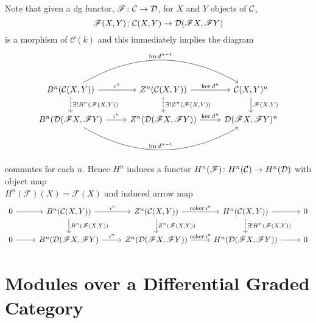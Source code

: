 \documentclass[dissertation.tex]{subfiles}
\begin{document}
\begin{rmk}\label{DGInducedHomology}
  Note that given a dg functor, $\mathscr{F} \colon \mathcal{C} \rightarrow \mathcal{D}$, for $X$ and $Y$ objects of $\mathcal{C}$, 
  $$\mathscr{F}(X,Y) \colon \mathcal{C}(X,Y) \rightarrow \mathcal{D}(\mathscr{F}X, \mathscr{F}Y)$$
  is a morphism of $\mathcal{C}(k)$ and this immediately implies the diagram
  $$\begin{tikzcd}
    B^n(\C(X,Y))\arrow{r}{\imath^n}\arrow[bend left]{rr}{\im d^{n-1}}\arrow[dashed]{d}{\exists !B^n(\F(X,Y))} & Z^n(\C(X,Y)) \arrow{r}{\ker d^n}\arrow[dashed]{d}{\exists !Z^n(\F(X,Y))} & \C(X,Y)^{n} \arrow{d}{\F(X,Y)}\\
    B^n(\D(\F X,\F Y) \arrow{r}{\imath^n}\arrow[bend right]{rr}{\im d^{n-1}} & Z^n(\D(\F X,\F Y))\arrow{r}{\ker d^n} & \D(\F X,\F Y)^{n}
  \end{tikzcd}$$
  commutes for each $n$.
  Hence $H^n$ induces a functor
  $H^n(\mathscr{F}) \colon H^n(\mathcal{C}) \rightarrow H^n(\mathcal{D})$
  with object map\\ $H^n(\mathscr{F})(X) = \mathscr{F}(X)$ and induced arrow map 
  $$\begin{tikzcd}
    0 \arrow{r} & B^n(\C(X,Y))\arrow{r}{\imath^n}\arrow{d}{B^n(\F(X,Y))} & Z^n(\C(X,Y)) \arrow{r}{\coker \imath^n}\arrow{d}{Z^n(\F(X,Y))} & H^n(\C(X,Y)) \arrow[dashed]{d}{\exists !H^n(\F(X,Y))}\arrow{r} & 0 \\
    0 \arrow{r} & B^n(\D(\F X,\F Y) \arrow{r}{\imath^n} & Z^n(\D(\F X,\F Y))\arrow{r}{\coker \imath^n} & H^n(\D(\F X,\F Y)) \arrow{r} & 0
  \end{tikzcd}$$
\end{rmk}

\section{Modules over a Differential Graded Category}
\end{document}
